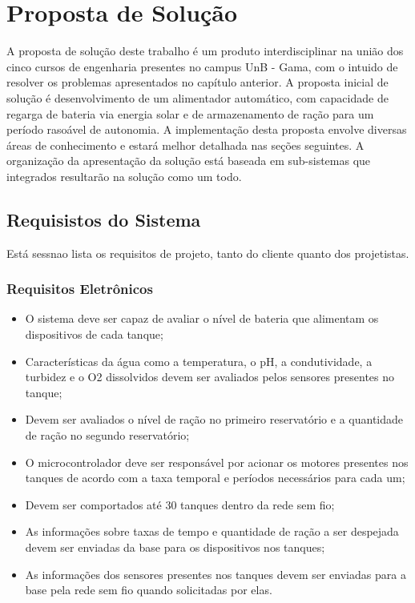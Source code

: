 \chapter[Proposta de Solução]{Proposta de Solução}\label{cap2}

A proposta de solução deste trabalho é um produto interdisciplinar na união dos cinco cursos de engenharia presentes no campus UnB - Gama, com o intuido de resolver os problemas apresentados no capítulo anterior. A proposta inicial de solução é desenvolvimento de um alimentador automático, com capacidade de regarga de bateria via energia solar e de armazenamento de ração para um período rasoável de autonomia. A implementação desta proposta envolve diversas áreas de conhecimento e estará melhor detalhada nas seções seguintes.
A organização da apresentação da solução está baseada em sub-sistemas que integrados resultarão na solução como um todo.

\section{Requisistos do Sistema}

Está sessnao lista os requisitos de projeto, tanto do cliente quanto dos projetistas.

\subsection{Requisitos Eletrônicos}

\begin{itemize}
  \item O sistema deve ser capaz de avaliar o nível de bateria que alimentam os dispositivos de cada tanque;
 \item Características da água como a temperatura, o pH, a condutividade, a turbidez e o O2 dissolvidos devem ser avaliados pelos sensores presentes no tanque;
\item Devem ser avaliados o nível de ração no primeiro reservatório e a quantidade de ração no segundo reservatório;
\item O microcontrolador deve ser responsável por acionar os motores presentes nos tanques de acordo com a taxa temporal e períodos necessários para cada um;
\item Devem ser comportados até 30 tanques dentro da rede sem fio;
\item As informações sobre taxas de tempo e quantidade de ração a ser despejada devem ser enviadas da base para os dispositivos nos tanques;
\item As informações dos sensores presentes nos tanques devem ser enviadas para a base pela rede sem fio quando solicitadas por elas.
\end{itemize}

